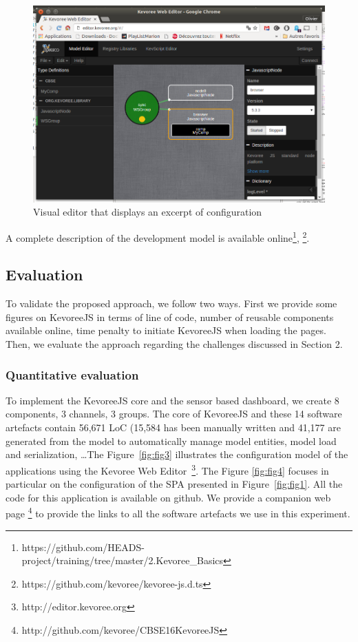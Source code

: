 \begin{figure}[h]
	\centering
	\includegraphics[width=1.\columnwidth]{figures/fig6}
	\caption{Visual editor that displays an excerpt of configuration}
	\label{fig:fig6}
\end{figure}


 A complete description of the development model is available online\footnote{ https://github.com/HEADS-project/training/tree/master/2.Kevoree\_Basics}, \footnote{https://github.com/kevoree/kevoree-js.d.ts}.

\subsection{Evaluation}
To validate the proposed approach, we follow two ways. First we provide some figures on KevoreeJS in terms of line of code, number of reusable components available online, time penalty to initiate KevoreeJS when loading the pages. Then, we evaluate the approach regarding the challenges discussed in Section 2.

\subsubsection{Quantitative evaluation}
To implement the KevoreeJS core and the sensor based dashboard, we create 8 components, 3 channels, 3 groups. The core of KevoreeJS and these 14 software artefacts contain 56,671 LoC (15,584 has been manually written and 41,177 are generated from the model to automatically manage model entities, model load and serialization, \dots The Figure~\ref{fig:fig3}  illustrates the configuration model of the applications using the Kevoree Web Editor~\footnote{http://editor.kevoree.org}. The Figure \ref{fig:fig4} focuses in particular on the configuration of the SPA presented in Figure~\ref{fig:fig1}. All the code for this application is available on github. We provide a companion web page \footnote{http://github.com/kevoree/CBSE16KevoreeJS} to provide the links to all the software artefacts we use in this experiment.


